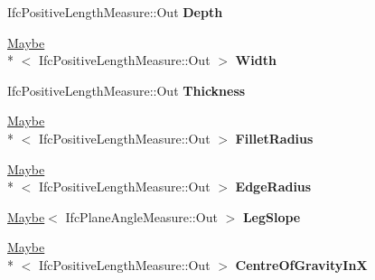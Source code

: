 \begin{DoxyCompactItemize}
\item 
\hypertarget{struct_assimp_1_1_i_f_c_1_1_ifc_l_shape_profile_def_ac449954e25effbcc8a08b3b3ffcf4fc3}{Ifc\+Positive\+Length\+Measure\+::\+Out {\bfseries Depth}}\label{struct_assimp_1_1_i_f_c_1_1_ifc_l_shape_profile_def_ac449954e25effbcc8a08b3b3ffcf4fc3}

\item 
\hypertarget{struct_assimp_1_1_i_f_c_1_1_ifc_l_shape_profile_def_a1c9fc4ea04f68fc9d2cfa637ed441635}{\hyperlink{struct_assimp_1_1_s_t_e_p_1_1_maybe}{Maybe}\\*
$<$ Ifc\+Positive\+Length\+Measure\+::\+Out $>$ {\bfseries Width}}\label{struct_assimp_1_1_i_f_c_1_1_ifc_l_shape_profile_def_a1c9fc4ea04f68fc9d2cfa637ed441635}

\item 
\hypertarget{struct_assimp_1_1_i_f_c_1_1_ifc_l_shape_profile_def_a40ea383698117f4f815454d40475ecc3}{Ifc\+Positive\+Length\+Measure\+::\+Out {\bfseries Thickness}}\label{struct_assimp_1_1_i_f_c_1_1_ifc_l_shape_profile_def_a40ea383698117f4f815454d40475ecc3}

\item 
\hypertarget{struct_assimp_1_1_i_f_c_1_1_ifc_l_shape_profile_def_a512ac3c8ff3e91d97862afd7b4f28d4b}{\hyperlink{struct_assimp_1_1_s_t_e_p_1_1_maybe}{Maybe}\\*
$<$ Ifc\+Positive\+Length\+Measure\+::\+Out $>$ {\bfseries Fillet\+Radius}}\label{struct_assimp_1_1_i_f_c_1_1_ifc_l_shape_profile_def_a512ac3c8ff3e91d97862afd7b4f28d4b}

\item 
\hypertarget{struct_assimp_1_1_i_f_c_1_1_ifc_l_shape_profile_def_ab1e8e1933d1c5b417a00fd6213a838c8}{\hyperlink{struct_assimp_1_1_s_t_e_p_1_1_maybe}{Maybe}\\*
$<$ Ifc\+Positive\+Length\+Measure\+::\+Out $>$ {\bfseries Edge\+Radius}}\label{struct_assimp_1_1_i_f_c_1_1_ifc_l_shape_profile_def_ab1e8e1933d1c5b417a00fd6213a838c8}

\item 
\hypertarget{struct_assimp_1_1_i_f_c_1_1_ifc_l_shape_profile_def_a424b1cb8ae40c14d1006350e805faffb}{\hyperlink{struct_assimp_1_1_s_t_e_p_1_1_maybe}{Maybe}$<$ Ifc\+Plane\+Angle\+Measure\+::\+Out $>$ {\bfseries Leg\+Slope}}\label{struct_assimp_1_1_i_f_c_1_1_ifc_l_shape_profile_def_a424b1cb8ae40c14d1006350e805faffb}

\item 
\hypertarget{struct_assimp_1_1_i_f_c_1_1_ifc_l_shape_profile_def_ac126e566152ffbfc1c50401297bba11f}{\hyperlink{struct_assimp_1_1_s_t_e_p_1_1_maybe}{Maybe}\\*
$<$ Ifc\+Positive\+Length\+Measure\+::\+Out $>$ {\bfseries Centre\+Of\+Gravity\+In\+X}}\label{struct_assimp_1_1_i_f_c_1_1_ifc_l_shape_profile_def_ac126e566152ffbfc1c50401297bba11f}


\end{DoxyCompactItemize}
